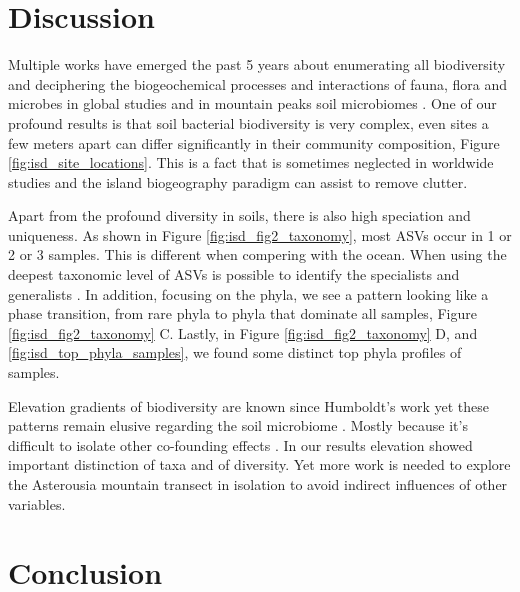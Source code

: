 \section{Discussion}\label{discussion}

Multiple works have emerged the past 5 years about enumerating all
biodiversity \parencite{Anthony2023} and deciphering the biogeochemical 
processes and interactions of fauna, flora and microbes in global
studies \parencite{Fry2019, Crowther2019,GRANDY201640,Delgado-Baquerizo2020} and
in mountain peaks soil microbiomes \parencite{Adamczyk2019}. One of our profound
results is that soil bacterial biodiversity is very complex, even sites a few meters apart can differ
significantly in their community composition, Figure \ref{fig:isd_site_locations}.
This is a fact that is sometimes neglected in worldwide studies and the island biogeography
paradigm can assist to remove clutter.

Apart from the profound diversity in soils, there is also high speciation and uniqueness. 
As shown in Figure \ref{fig:isd_fig2_taxonomy}, most ASVs occur in 1 or 2 or 3 samples.
This is different when compering with the ocean. When using the deepest taxonomic
level of ASVs is possible to identify the specialists and generalists \parencite{Barberan2012}. 
In addition, focusing on the phyla, we see a pattern looking like a phase transition, from 
rare phyla to phyla that dominate all samples, Figure \ref{fig:isd_fig2_taxonomy} C. Lastly, in Figure \ref{fig:isd_fig2_taxonomy} D,
and \ref{fig:isd_top_phyla_samples}, we found some distinct top phyla profiles of samples.

Elevation gradients of biodiversity are known since Humboldt's work \parencite{Rahbek2019} 
yet these patterns remain elusive regarding the soil microbiome \parencite{Looby2020, Siles2023}.
Mostly because it's difficult to isolate other co-founding effects \parencite{Nottingham2018}.
In our results elevation showed important distinction of taxa and of diversity. Yet more work is 
needed to explore the Asterousia mountain transect in isolation to avoid indirect influences of 
other variables.


\section{Conclusion}

